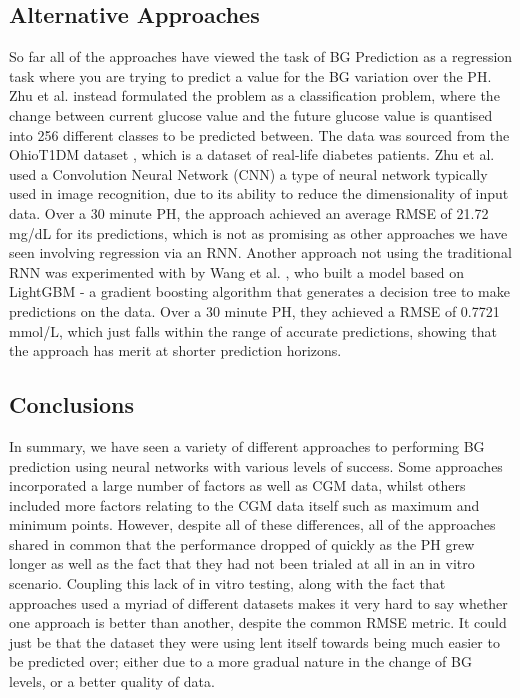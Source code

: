       \subsection{Alternative Approaches}

      So far all of the approaches have viewed the task of BG Prediction as a regression task where you are trying to predict a value for the BG variation over the PH. Zhu et al. \cite{paper7} instead formulated the problem as a classification problem, where the change between current glucose value and the future glucose value is quantised into 256 different classes to be predicted between. The data was sourced from the OhioT1DM dataset \cite{ohio}, which is a dataset of real-life diabetes patients. Zhu et al. used a Convolution Neural Network (CNN) \cite{whatiscnn} a type of neural network typically used in image recognition, due to its ability to reduce the dimensionality of input data. Over a 30 minute PH, the approach achieved an average RMSE of 21.72 mg/dL for its predictions, which is not as promising as other approaches we have seen involving regression via an RNN. Another approach not using the traditional RNN was experimented with by Wang et al. \cite{paper10}, who built a model based on LightGBM \cite{lightgbm} - a gradient boosting algorithm that generates a decision tree to make predictions on the data. Over a 30 minute PH, they achieved a RMSE of 0.7721 mmol/L, which just falls within the range of accurate predictions, showing that the approach has merit at shorter prediction horizons.

	\subsection{Conclusions}
      In summary, we have seen a variety of different approaches to performing BG prediction using neural networks with various levels of success. Some approaches incorporated a large number of factors as well as CGM data, whilst others included more factors relating to the CGM data itself such as maximum and minimum points. However, despite all of these differences, all of the approaches shared in common that the performance dropped of quickly as the PH grew longer as well as the fact that they had not been trialed at all in an in vitro scenario. Coupling this lack of in vitro testing, along with the fact that approaches used a myriad of different datasets makes it very hard to say whether one approach is better than another, despite the common RMSE metric. It could just be that the dataset they were using lent itself towards being much easier to be predicted over; either due to a more gradual nature in the change of BG levels, or a better quality of data. 

